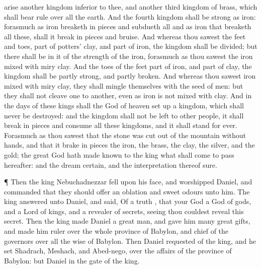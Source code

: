 {arise
another
kingdom
inferior to
thee, and
another
third
kingdom of
brass, which shall bear
rule over
all the
earth.
And the
fourth
kingdom shall
be
strong as
iron: forasmuch as
iron breaketh in
pieces and
subdueth
all
{} and
as
iron that
breaketh
all
these, shall it break in
pieces and
bruise.
And whereas thou
sawest the
feet and
toes,
part of
potters’
clay, and
part of
iron, the
kingdom shall
be
divided;
but there shall
be in it
of the
strength of the
iron, forasmuch
as thou
sawest the
iron
mixed with
miry
clay.
And
{} the
toes of the
feet
{}
part of
iron, and
part of
clay,
{} the
kingdom shall
be
partly
strong, and
partly
broken.
And
whereas thou
sawest
iron
mixed with
miry
clay, they shall mingle
themselves with the
seed of
men: but they
shall
not
cleave
one
to
another,
even as
iron is
not
mixed with
clay.
And in the
days of
these
kings shall the
God of
heaven set
up a
kingdom, which shall
never be
destroyed: and the
kingdom shall
not be
left to
other
people,
{} it shall break in
pieces and
consume
all
these
kingdoms, and
it shall
stand for
ever.
Forasmuch
as thou
sawest that the
stone was cut
out of the
mountain
without
hands, and that it brake in
pieces the
iron, the
brass, the
clay, the
silver, and the
gold; the
great
God hath made
known to the
king
what shall come to
pass
hereafter: and the
dream
{}
certain, and the
interpretation thereof
sure.
\par }{\PP {}¶
Then the
king
Nebuchadnezzar
fell
upon his
face, and
worshipped
Daniel, and
commanded that they should
offer an
oblation and sweet
odours unto him.
The
king
answered unto
Daniel, and
said,
Of a
truth
{},
that your
God
{} a
God of
gods, and a
Lord of
kings, and a
revealer of
secrets, seeing thou
couldest
reveal
this
secret.
Then the
king
made
Daniel a great
man, and
gave him
many
great
gifts, and made him
ruler
over the
whole
province of
Babylon, and
chief of the
governors
over
all the
wise
{} of
Babylon.
Then
Daniel
requested
of the
king, and he
set
Shadrach,
Meshach, and
Abed-nego,
over the
affairs of the
province of
Babylon: but
Daniel
{} in the
gate of the
king.

}
